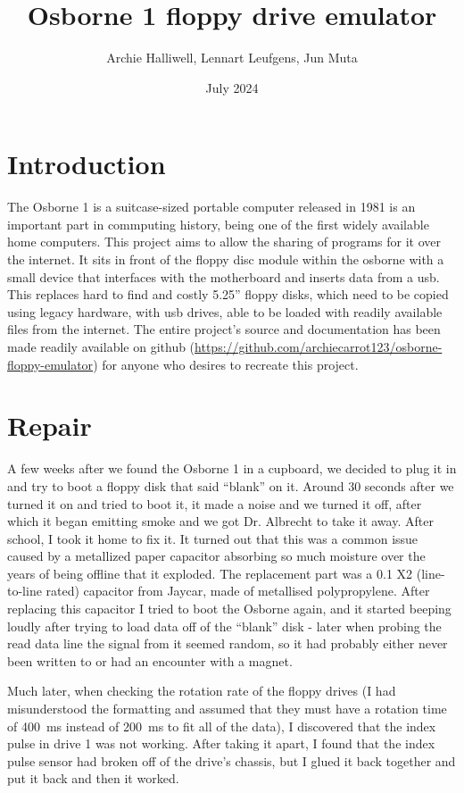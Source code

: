 \documentclass[a4paper]{article}
\begin{document}
\title{Osborne 1 floppy drive emulator}
\date{July 2024}
\author{Archie Halliwell, Lennart Leufgens, Jun Muta}
\maketitle

\section{Introduction}

The Osborne 1 is a suitcase-sized portable computer released in 1981
is an important part in commputing history, being one of the first
widely available home computers. This project aims to allow the
sharing of programs for it over the internet. It sits in front of the
floppy disc module within the osborne with a small device that
interfaces with the motherboard and inserts data from a usb. This
replaces hard to find and costly 5.25'' floppy disks, which need to be
copied using legacy hardware, with usb drives, able to be loaded with
readily available files from the internet. The entire project's source
and documentation has been made readily available on github
(\url{https://github.com/archiecarrot123/osborne-floppy-emulator}) for
anyone who desires to recreate this project.

\section{Repair}

A few weeks after we found the Osborne 1 in a cupboard, we decided to
plug it in and try to boot a floppy disk that said ``blank'' on
it. Around 30 seconds after we turned it on and tried to boot it, it
made a noise and we turned it off, after which it began emitting smoke
and we got Dr. Albrecht to take it away. After school, I took it home
to fix it. It turned out that this was a common issue caused by a
metallized paper capacitor absorbing so much moisture over the years
of being offline that it exploded. The replacement part was a
\qty{0.1}{\uF} X2 (line-to-line rated) capacitor from Jaycar, made of
metallised polypropylene. After replacing this capacitor I tried to
boot the Osborne again, and it started beeping loudly after trying to
load data off of the ``blank'' disk - later when probing the read data
line the signal from it seemed random, so it had probably either never
been written to or had an encounter with a magnet.

Much later, when checking the rotation rate of the floppy drives (I
had misunderstood the formatting and assumed that they must have a
rotation time of \qty{400}{\ms} instead of \qty{200}{\ms} to fit all
of the data), I discovered that the index pulse in drive 1 was not
working. After taking it apart, I found that the index pulse sensor
had broken off of the drive's chassis, but I glued it back together
and put it back and
then it worked.
\end{document}
